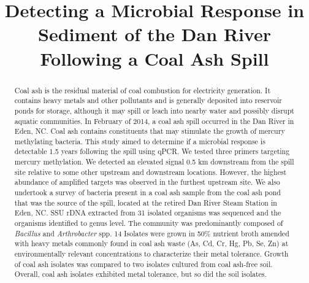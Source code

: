 \documentclass[ms, hidelinks]{uncgdissertationexp}
\title{Detecting a Microbial Response in Sediment of the Dan River Following a Coal Ash Spill}
\theoremstyle{plain}
\theoremstyle{definition}
\theoremstyle{remark}
\begin{document}
\frontmatter      %

\begin{abstract}
Coal ash is the residual material of coal combustion for electricity generation. It contains heavy metals and other pollutants and is generally deposited into reservoir ponds for storage, although it may spill or leach into nearby water and possibly disrupt aquatic communities. In February of 2014, a coal ash spill occurred in the Dan River in Eden, NC. Coal ash contains constituents that may stimulate the growth of mercury methylating bacteria. This study aimed to determine if a microbial response is detectable 1.5 years following the spill using qPCR. We tested three primers targeting mercury methylation. We detected an elevated signal 0.5 km downstream from the spill site relative to some other upstream and downstream locations. However, the highest abundance of amplified targets was observed in the furthest upstream site. We also undertook a survey of bacteria present in a coal ash sample from the coal ash pond that was the source of the spill, located at the retired Dan River Steam Station in Eden, NC. SSU rDNA extracted from 31 isolated organisms was sequenced and the organisms identified to genus level. The community was predominantly composed of \emph{Bacillus} and \emph{Arthrobacter} spp. 14 Isolates were grown in 50\% nutrient broth amended with heavy metals commonly found in coal ash waste (As, Cd, Cr, Hg, Pb, Se, Zn) at environmentally relevant concentrations to characterize their metal tolerance. Growth of coal ash isolates was compared to two isolates cultured from coal ash-free soil. Overall, coal ash isolates exhibited metal tolerance, but so did the soil isolates.
\end{abstract}
\maketitlepage

\end{document}
